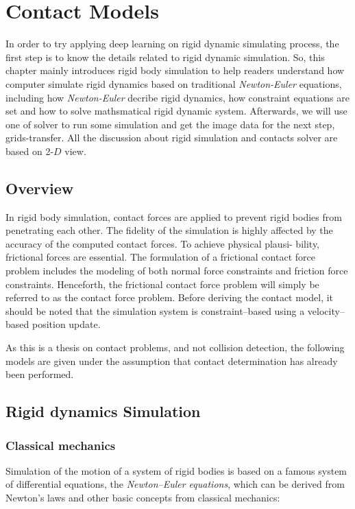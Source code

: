 \chapter{Contact Models}

In order to try applying deep learning on rigid dynamic simulating process, the first step is to know the details related to rigid dynamic simulation. So, this chapter mainly introduces rigid body simulation to help readers understand how computer simulate rigid dynamics based on traditional \textit{Newton-Euler} equations, including how \textit{Newton-Euler} decribe rigid dynamics, how constraint equations are set and how to solve mathsmatical rigid dynamic system. Afterwards, we will use one of solver to run some simulation and get the image data for the next step, grids-transfer. All the discussion about rigid simulation and contacts solver are based on 2-$D$ view.

\section{Overview}

In rigid body simulation, contact forces are applied to prevent rigid bodies from penetrating each other. The fidelity of the simulation is highly affected by the accuracy of the computed contact forces. To achieve physical plausi- bility, frictional forces are essential. The formulation of a frictional contact force problem includes the modeling of both normal force constraints and friction force constraints. Henceforth, the frictional contact force problem will simply be referred to as the contact force problem. Before deriving the contact model, it should be noted that the simulation system is constraint–based using a velocity–based position update\cite{Erleben:2007:VSP:1243980.1243986}.

As this is a thesis on contact problems, and not collision detection, the following models are given under the assumption that contact determination has already been performed.

\section{Rigid dynamics Simulation}

\subsection{Classical mechanics}
Simulation of the motion of a system of rigid bodies is based on a famous system of differential equations, the \textit{Newton–Euler equations}, which can be derived from Newton’s laws and other basic concepts from classical mechanics:

